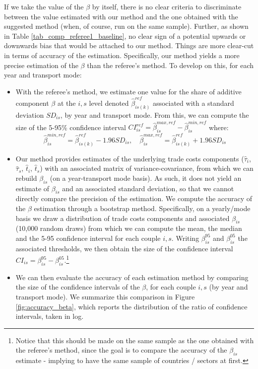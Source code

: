 \documentclass[a4paper,11pt]{article}
\begin{document}
\begin{itemize}
If we take the value of the $\beta$ by itself, there is no clear criteria to discriminate between the value estimated with our method and the one obtained with the suggested method (when, of course, run on the same sample). Further, as shown in Table \ref{tab_comp_referee1_baseline}, no clear sign of a potential upwards or downwards bias that would be attached to our method. Things are more clear-cut in terms of accuracy of the estimation. Specifically, our method yields a more precise estimation of the $\beta$ than the referee's method. To develop on this, for each year and transport mode:
    \begin{itemize}
    \item With the referee's method, we estimate one value for the share of additive component $\beta$ at the $i,s$ level denoted $\hat{\beta}^{ref}_{is(k)}$ associated with a standard deviation $SD_{is}$, by year and transport mode. From this, we can compute the size of the 5-95\% confidence interval $CI^{ref}_{is} = \hat{\beta}_{is}^{max,ref} - \hat{\beta}_{is}^{min,ref}$ where:
        $$\hat{\beta}_{is}^{min,ref} = \hat{\beta}^{ref}_{is(k)} - 1.96 SD_{is},\quad \hat{\beta}_{is}^{max,ref} = \hat{\beta}^{ref}_{is(k)} + 1.96 SD_{is}$$

        \item  Our method provides estimates of the underlying trade costs components ($\widehat{\tau}_i$, $\widehat{\tau}_s$, $\widehat{t}_i$, $\widehat{t}_s$) with an associated matrix of variance-covariance, from which we can rebuild $\beta_{is}$ (on a year-transport mode basis). As such, it does not yield an estimate of $\beta_{is}$ and an associated standard deviation, so that we cannot directly compare the precision of the estimation. We compute the accuracy of the $\beta$ estimation through a bootstrap method. Specifically, on a yearly/mode basis we draw a distribution of trade costs components and associated $\beta_{is}$ (10,000 random draws) from which we can compute the mean, the median and the 5-95 confidence interval for each couple $i,s$. Writing $\beta_{is}^{95}$ and $\beta_{is}^{05}$ the associated thresholds, we then obtain the size of the confidence interval $CI_{is}= \beta_{is}^{95}- \beta_{is}^{05}$.\footnote{Notice that this should be made on the same sample as the one obtained with the referee's method, since the goal is to compare the accuracy of the $\beta_{is}$ estimate - implying to have the same sample of countries / sectors at first. }



    \item We can then evaluate the accuracy of each estimation method by comparing the size of the confidence intervals of the $\beta$, for each couple $i,s$ (by year and transport mode). We summarize this comparison in Figure \ref{fig:accuracy_beta}, which reports the distribution of the ratio of confidence intervals, taken in log.



\end{itemize}
\end{itemize}
\end{document}
